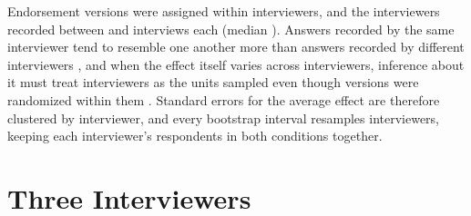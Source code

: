 \documentclass[11pt,letterpaper]{article}
\begin{document}
Endorsement versions were assigned within interviewers, and the \InterviewerCount{} interviewers recorded between \MinInterviews{} and \MaxInterviews{} interviews each (median \MedianInterviews{}). Answers recorded by the same interviewer tend to resemble one another more than answers recorded by different interviewers \citep{west2017interviewer}, and when the effect itself varies across interviewers, inference about it must treat interviewers as the units sampled even though versions were randomized within them \citep{abadie2023clustering}. Standard errors for the average effect are therefore clustered by interviewer, and every bootstrap interval resamples interviewers, keeping each interviewer's respondents in both conditions together.

\section{Three Interviewers}
\label{sec:interviewers}
\end{document}
